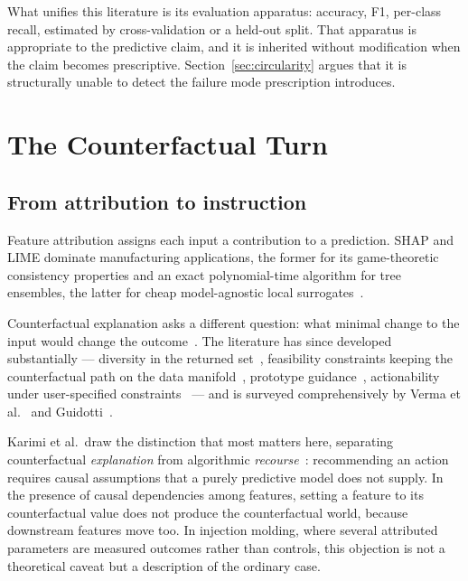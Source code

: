 \documentclass[11pt,a4paper]{article}
\begin{document}
What unifies this literature is its evaluation apparatus: accuracy, F1, per-class recall, estimated by cross-validation or a held-out split. That apparatus is appropriate to the predictive claim, and it is inherited without modification when the claim becomes prescriptive. Section~\ref{sec:circularity} argues that it is structurally unable to detect the failure mode prescription introduces.

\section{The Counterfactual Turn}\label{sec:cfturn}

\subsection{From attribution to instruction}

Feature attribution assigns each input a contribution to a prediction. SHAP and LIME dominate manufacturing applications, the former for its game-theoretic consistency properties and an exact polynomial-time algorithm for tree ensembles, the latter for cheap model-agnostic local surrogates~\cite{lundberg2017,ribeiro2016}.

Counterfactual explanation asks a different question: what minimal change to the input would change the outcome~\cite{wachter2018}. The literature has since developed substantially --- diversity in the returned set~\cite{mothilal2020}, feasibility constraints keeping the counterfactual path on the data manifold~\cite{poyiadzi2020}, prototype guidance~\cite{vanlooveren2021}, actionability under user-specified constraints~\cite{ustun2019} --- and is surveyed comprehensively by Verma et al.~\cite{verma2024} and Guidotti~\cite{guidotti2024}.

Karimi et al.\ draw the distinction that most matters here, separating counterfactual \emph{explanation} from algorithmic \emph{recourse}~\cite{karimi2021}: recommending an action requires causal assumptions that a purely predictive model does not supply. In the presence of causal dependencies among features, setting a feature to its counterfactual value does not produce the counterfactual world, because downstream features move too. In injection molding, where several attributed parameters are measured outcomes rather than controls, this objection is not a theoretical caveat but a description of the ordinary case.
\end{document}
